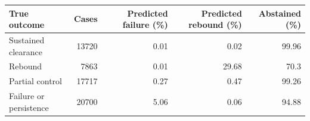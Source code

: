 \begin{tabular}{lrrrr}
\toprule
True outcome & Cases & Predicted failure (\%) & Predicted rebound (\%) & Abstained (\%) \\
\midrule
Sustained clearance & 13720 & 0.01 & 0.02 & 99.96 \\
Rebound & 7863 & 0.01 & 29.68 & 70.3 \\
Partial control & 17717 & 0.27 & 0.47 & 99.26 \\
Failure or persistence & 20700 & 5.06 & 0.06 & 94.88 \\
\bottomrule
\end{tabular}
